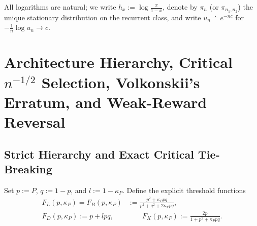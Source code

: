 \documentclass[11pt,reqno]{amsart}
\theoremstyle{definition}
\theoremstyle{remark}
\begin{document}
All logarithms are natural; we write $h_x := \log\frac{x}{1-x}$, denote by $\pi_n$ (or $\pi_{n_1,n_2}$) the unique stationary distribution on the recurrent class, and write $u_n \doteq e^{-nc}$ for $-\frac{1}{n}\log u_n \to c$.

\section{Architecture Hierarchy, Critical \texorpdfstring{$n^{-1/2}$}{n\^{}(-1/2)} Selection, Volkonskii's Erratum, and Weak-Reward Reversal}

\subsection{Strict Hierarchy and Exact Critical Tie-Breaking}
Set $p := P$, $q := 1-p$, and $l := 1-\kappa_P$. Define the explicit threshold functions
\begin{equation}\label{eq:thresholds}
\begin{aligned}
  F_L(p,\kappa_P) = F_B(p,\kappa_P) &:= \frac{p^2 + \kappa_P p q}{p^2 + q^2 + 2\kappa_P p q}, \\
  F_D(p,\kappa_P) := p + l p q, &\qquad
  F_K(p,\kappa_P) := \frac{2p}{1 + p^2 + \kappa_P p q}.
\end{aligned}
\end{equation}
\end{document}
